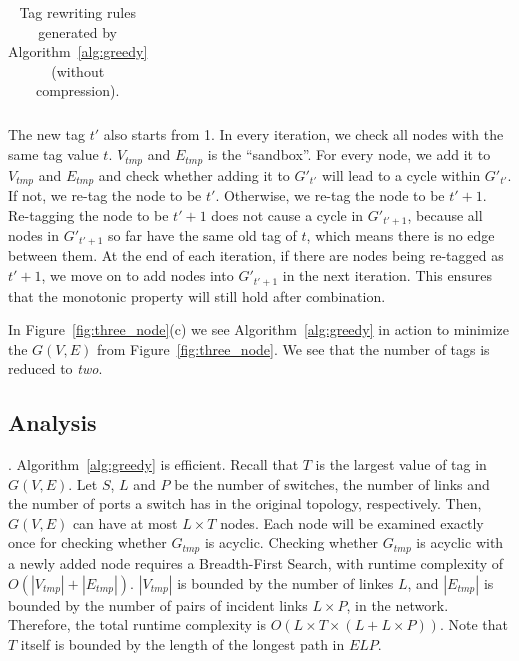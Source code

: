 \begin{table}[t]
\begin{tabular}{lll}
	\end{tabular}
	\vspace{-1em}
	\caption{Tag rewriting rules generated by Algorithm~\ref{alg:greedy} (without compression).}
	\vspace{-1em}
	\label{table:tagging_table2}
\end{table}

The new tag $t'$ also starts from 1. In every iteration, we check all nodes with
the same tag value $t$. $V_{tmp}$ and $E_{tmp}$ is the ``sandbox''. For every
node, we add it to $V_{tmp}$ and $E_{tmp}$ and check whether adding it to
$G'_{t'}$ will lead to a cycle within $G'_{t'}$. If not, we re-tag the node to
be $t'$. Otherwise, we re-tag the node to be $t'+1$.  Re-tagging the node to be
$t'+1$ does not cause a cycle in $G'_{t'+1}$, because all nodes in $G'_{t'+1}$
so far have the same old tag of $t$, which means there is no edge between them.
At the end of each iteration, if there are nodes being re-tagged as $t'+1$, we
move on to add nodes into $G'_{t'+1}$ in the next iteration.  This ensures that
the monotonic property will still hold after combination.

In Figure~\ref{fig:three_node}(c) we see Algorithm~\ref{alg:greedy} in action to
minimize the $G(V,E)$ from Figure~\ref{fig:three_node}. We see that the number
of tags is reduced to {\em two}.

\subsection {Analysis}
\label{subsec:caveats}

. Algorithm~\ref{alg:greedy} is efficient. Recall that
$T$ is the largest value of tag in $G(V,E)$. Let $S$, $L$ and $P$ be the number 
of switches, the number of links and the number of ports a switch has in the
original topology, respectively. Then, $G(V,E)$ can have at most $L \times T$
nodes.  Each node will be examined exactly once for checking whether $G_{tmp}$
is acyclic.  Checking whether $G_{tmp}$ is acyclic with a newly added node
requires a Breadth-First Search, with runtime complexity of $O(|V_{tmp}| +
|E_{tmp}|)$. $|V_{tmp}|$ is bounded by the number of linkes $L$, and $|E_{tmp}|$ 
is bounded by the number of pairs of incident links $L \times P$, in the network.  Therefore,
the total runtime complexity is $O(L \times T \times (L+L \times P))$. Note that $T$
itself is bounded by the length of the longest path in $ELP$.


